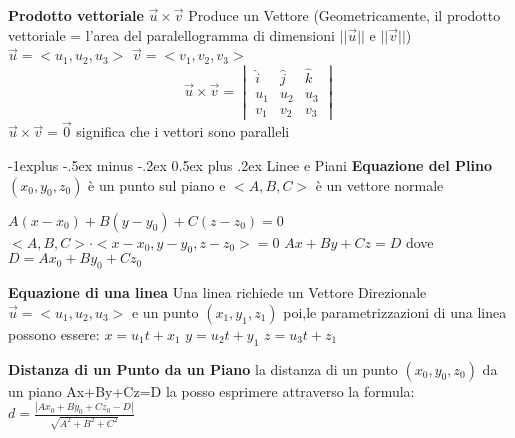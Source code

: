 \documentclass[10pt,landscape]{article}
\makeatletter
\renewcommand{\subsection}{\@startsection{subsection}{2}{0mm}%
                                {-1explus -.5ex minus -.2ex}%
                                {0.5ex plus .2ex}%
                                {\normalfont\normalsize\bfseries}}
\makeatother
\begin{document}
\begin{multicols*}{5}
\textbf{Prodotto vettoriale}\newline
$\vec{u} \times \vec{v}$\newline
Produce un Vettore\newline
(Geometricamente, il prodotto vettoriale = l'area del paralellogramma di dimensioni $ ||\vec{u}|| $ e  $ ||\vec{v}|| $)\newline
$\vec{u} = < u_1, u_2, u_3 >$\newline
$\vec{v} = < v_1, v_2, v_3 >$\newline
\[
\vec{u} \times \vec{v} = 
\begin{vmatrix}
\hat{i} & \hat{j} & \hat{k} \\
u_1 & u_2 & u_3 \\
v_1 & v_2 & v_3
\end{vmatrix}
\]\newline 
$ \vec{u} \times \vec{v} = \vec{0} $ significa che i vettori sono paralleli 

\subsection {Linee e Piani}
\textbf{Equazione del Plino}\newline
$ (x_0, y_0, z_0) $ \`e un punto sul piano e $ <A,B,C> $ \`e un vettore normale \newline

$A(x-x_0)+B(y-y_0)+C(z-z_0) = 0$\newline
$ <A,B,C> \cdot <x-x_0, y-y_0, z-z_0> = 0 $\newline
$ Ax+By+Cz = D $ dove $ D=Ax_0+By_0+Cz_0 $\newline

\textbf{Equazione di una linea}\newline
Una linea richiede un Vettore Direzionale $ \vec{u}=<u_1,u_2,u_3> $ e un punto $(x_1,y_1,z_1)$\newline
poi,\newline le parametrizzazioni di una linea  possono essere:\newline
$ x = u_1t+x_1 $\newline
$ y = u_2t+y_1 $\newline
$ z = u_3t+z_1 $\newline

\textbf{Distanza di un Punto da un Piano}\newline
la distanza di un punto $(x_0,y_0,z_0)$ da un piano  Ax+By+Cz=D la posso esprimere attraverso la formula:\newline
$ d=\frac{|Ax_0+By_0+Cz_0-D|}{\sqrt{A^2+B^2+C^2}} $\newline



\end{multicols*}
\end{document}
